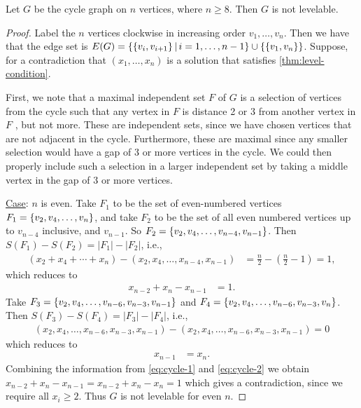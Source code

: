 \begin{theorem}\label{thm:cycles}
Let $G$ be the cycle graph on $n$ vertices, where $n \geq 8$. Then $G$ is not levelable.
\end{theorem}
\begin{proof}
Label the $n$ vertices clockwise in increasing order $v_1, \dots, v_n$. Then we have that the edge set is $E(G)= \{  \{ v_i, v_{i+1} \} \, | \,i = 1, \dots, n-1 \} \cup \{ \{ v_1, v_n \} \}$. Suppose, for a contradiction that $(x_1, \dots, x_n)$ is a solution that satisfies \autoref{thm:level-condition}.

First, we note that a maximal independent set $F$ of $G$ is a selection of vertices from the cycle such that any vertex in $F$ is distance 2 or  3 from another vertex in $F$ , but not more. These are independent sets, since we have chosen vertices that are not adjacent in the cycle. Furthermore, these are maximal since any smaller selection would have a gap of 3 or more vertices in the cycle. We could then properly include such a selection in a larger independent set by taking a middle vertex in the gap of 3 or more vertices. 

\noindent
\underline{Case}: $n$ is even.  
Take $F_1$ to be the set of even-numbered vertices $F_1 = \{ v_2, v_4, \dots, v_n \}$, and take $F_2$ to be the set of all even numbered vertices up to $v_{n-4}$ inclusive, and $v_{n-1}$. So $F_2 = \{ v_2, v_4, \dots, v_{n-4}, v_{n-1} \}$. Then  $S(F_1) - S(F_2) = |F_1| - |F_2|$, i.e.,
\begin{equation*}
\begin{aligned}
(x_2 + x_4 + \cdots + x_n) - (x_2, x_4, \dots, x_{n-4}, x_{n-1}) &= \frac{n}{2} - \left(\frac{n}{2} - 1\right) = 1,
\end{aligned}
\end{equation*}
which reduces to
\begin{equation}\label{eq:cycle-1}
\begin{aligned}
x_{n-2} + x_n - x_{n-1} &= 1.
\end{aligned}
\end{equation}
Take $F_3 = \{ v_2, v_4, \dots, v_{n-6}, v_{n-3}, v_{n-1} \}$ and $F_4 = \{ v_2, v_4, \dots, v_{n-6}, v_{n-3}, v_n \}$. Then $S(F_3) - S(F_4) = |F_3| - |F_4|$, i.e.,
\begin{equation*}
\begin{aligned}
(x_2, x_4, \dots, x_{n-6}, x_{n-3}, x_{n-1}) - (x_2, x_4, \dots, x_{n-6}, x_{n-3}, x_{n-1}) = 0
\end{aligned}
\end{equation*}
which reduces to
\begin{equation} \label{eq:cycle-2}
\begin{aligned}
x_{n-1} & = x_n.
\end{aligned}
\end{equation}
Combining the information from \eqref{eq:cycle-1} and \eqref{eq:cycle-2} we obtain $x_{n-2} + x_n - x_{n-1} = x_{n-2} + x_n - x_n = 1$ which gives a contradiction, since we require all $x_i \geq 2$. Thus $G$ is not levelable for even $n$.


\end{proof}
